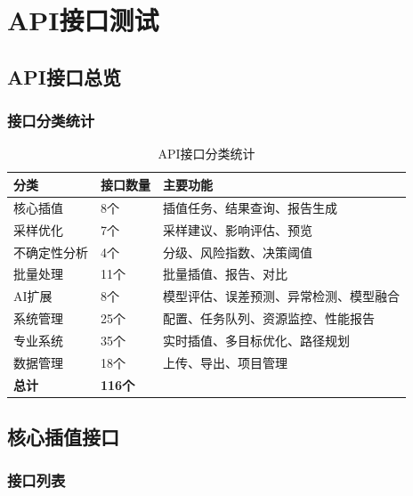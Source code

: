 \documentclass[12pt,a4paper,openany]{report}
\begin{document}
\chapter{API接口测试}

\section{API接口总览}

\subsection{接口分类统计}

\begin{table}[h]
\centering
\caption{API接口分类统计}
\begin{tabular}{|l|l|l|}
\hline
\textbf{分类} & \textbf{接口数量} & \textbf{主要功能} \\
\hline
核心插值 & 8个 & 插值任务、结果查询、报告生成 \\
采样优化 & 7个 & 采样建议、影响评估、预览 \\
不确定性分析 & 4个 & 分级、风险指数、决策阈值 \\
批量处理 & 11个 & 批量插值、报告、对比 \\
AI扩展 & 8个 & 模型评估、误差预测、异常检测、模型融合 \\
系统管理 & 25个 & 配置、任务队列、资源监控、性能报告 \\
专业系统 & 35个 & 实时插值、多目标优化、路径规划 \\
数据管理 & 18个 & 上传、导出、项目管理 \\
\hline
\textbf{总计} & \textbf{116个} & \\
\hline
\end{tabular}
\end{table}

\section{核心插值接口}

\subsection{接口列表}
\end{document}
